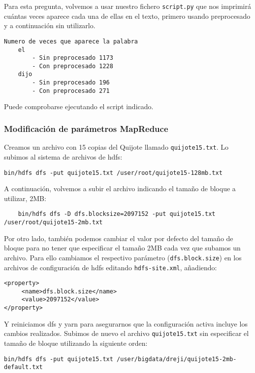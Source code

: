 \documentclass[11pt]{article}
\def\inline{\lstinline[basicstyle=\ttfamily,keywordstyle={}]}
\begin{document}
Para esta pregunta, volvemos a usar nuestro fichero \inline{script.py} que nos imprimirá cuántas veces aparece cada una de ellas en el texto, primero usando preprocesado y a continuación sin utilizarlo.

\begin{verbatim}
Numero de veces que aparece la palabra
    el
        - Sin preprocesado 1173
        - Con preprocesado 1228
    dijo
        - Sin preprocesado 196
        - Con preprocesado 271
\end{verbatim}

Puede comprobarse ejecutando el script indicado.

\subsubsection{ Modificación de parámetros MapReduce }

Creamos un archivo con 15 copias del Quijote llamado \inline{quijote15.txt}. Lo subimos al sistema de archivos de hdfs:

\begin{verbatim}
bin/hdfs dfs -put quijote15.txt /user/root/quijote15-128mb.txt
\end{verbatim}

A continuación, volvemos a subir el archivo indicando el tamaño de bloque a utilizar, 2MB:

\begin{verbatim}
	bin/hdfs dfs -D dfs.blocksize=2097152 -put quijote15.txt /user/root/quijote15-2mb.txt
\end{verbatim}

Por otro lado, también podemos cambiar el valor por defecto del tamaño de bloque para no tener que especificar el tamaño 2MB cada vez que subamos un archivo. Para ello cambiamos el respectivo parámetro (\inline{dfs.block.size}) en los archivos de configuración de hdfs editando \inline{hdfs-site.xml}, añadiendo:

\begin{verbatim}
<property>
     <name>dfs.block.size</name>
     <value>2097152</value>
</property>
\end{verbatim}

Y reiniciamos dfs y yarn para asegurarnos que la configuración activa incluye los cambios realizados. Subimos de nuevo el archivo \inline{quijote15.txt} sin especificar el tamaño de bloque utilizando la siguiente orden:

\begin{verbatim}
bin/hdfs dfs -put quijote15.txt /user/bigdata/dreji/quijote15-2mb-default.txt
\end{verbatim}
\end{document}
